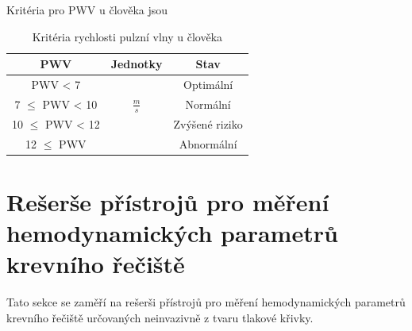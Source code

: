 Kritéria pro PWV u člověka jsou
\begin{table}[H]
    \label{tab:pwv_criteria}
    \caption{Kritéria rychlosti pulzní vlny u člověka \cite{cite:Fabian}}
    \begin{ctucolortab}
        \begin{tabular}{ccc}
            \toprule
            PWV                & Jednotky      & Stav           \\ \midrule
            PWV < 7            &               & Optimální      \\
            7 $\leq$ PWV < 10  & $\frac{m}{s}$ & Normální       \\
            10 $\leq$ PWV < 12 &               & Zvýšené riziko \\
            12  $\leq$ PWV     &               & Abnormální     \\

            \bottomrule
        \end{tabular}
    \end{ctucolortab}
\end{table}
\section{Rešerše přístrojů pro měření hemodynamických parametrů krevního řečiště}
Tato sekce se zaměří na rešerši přístrojů pro měření hemodynamických parametrů krevního řečiště určovaných neinvazivně z tvaru
tlakové křivky.
